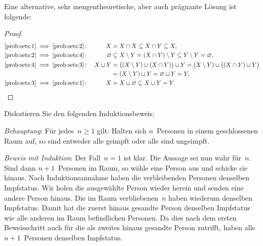 \documentclass[a4paper]{article}
\begin{document}
\begin{solution}
    Eine alternative, sehr mengentheoretische, aber auch prägnante Lösung ist folgende:
    \begin{proof}
        \begin{align*}
            \text{\ref{prob:sets:1}} & \implies \text{\ref{prob:sets:2}}\colon & X           & = X \cap X \subseteq X \cap Y \subseteq X,                                                                \\
            \text{\ref{prob:sets:2}} & \implies \text{\ref{prob:sets:4}}\colon & \varnothing & \subseteq X \setminus Y = (X \cap Y) \setminus Y \subseteq Y \setminus Y = \varnothing,                   \\
            \text{\ref{prob:sets:4}} & \implies \text{\ref{prob:sets:3}}\colon & X \cup Y    & = \bigl((X \setminus Y) \cup (X \cap Y)\bigr) \cup Y = (X \setminus Y) \cup \bigl((X \cap Y) \cup Y\bigr) \\
                                     &                                         &             & = (X \setminus Y) \cup Y = \varnothing \cup Y = Y,                                                        \\
            \text{\ref{prob:sets:3}} & \implies \text{\ref{prob:sets:1}}\colon & X           & = X \cup \varnothing \subseteq X \cup Y = Y. \qedhere
        \end{align*}
    \end{proof}
\end{solution}

\begin{problem}[B01.A2]
Diskutieren Sie den folgenden Induktionsbeweis:

\emph{Behauptung}: Für jedes~$n \geq 1$ gilt: Halten sich $n$~Personen in einem geschlossenen Raum auf, so sind entweder alle geimpft oder alle sind ungeimpft.

\emph{Beweis mit Induktion}: Der Fall~$n = 1$ ist klar. Die Aussage sei nun wahr für~$n$. Sind dann $n+1$~Personen im Raum, so wähle eine Person aus und schicke sie hinaus. Nach Induktionsannahme haben die verbleibenden Personen denselben Impfstatus. Wir holen die ausgewählte Person wieder herein und senden eine andere Person hinaus. Die im Raum verbliebenen~$n$ haben wiederum denselben Impfstatus. Damit hat die zuerst hinaus gesandte Person denselben Impfstatus wie alle anderen im Raum befindlichen Personen. Da dies nach dem ersten Beweisschritt auch für die als zweites hinaus gesandte Person zutrifft, haben alle $n+1$~Personen denselben Impfstatus.
\end{problem}
\end{document}
